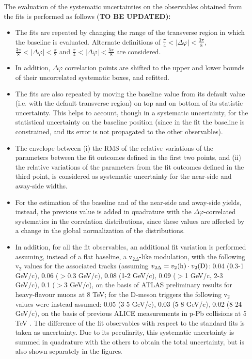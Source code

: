 The evaluation of the systematic uncertainties on the observables obtained from the fits is performed as follows (\bf{TO BE UPDATED}):

\begin{itemize}
\item The fits are repeated by changing the range of the transverse region in which the baseline is evaluated. Alternate definitions of $\frac{\pi}{4}<|\Delta\varphi|<\frac{3\pi}{8}$, $\frac{3\pi}{8}<|\Delta\varphi|<\frac{\pi}{2}$ and $\frac{\pi}{4}<|\Delta\varphi|<\frac{5\pi}{8}$ are considered.
\item In addition, $\Delta\varphi$ correlation points are shifted to the upper and lower bounds of their uncorrelated systematic boxes, and refitted.
\item The fits are also repeated by moving the baseline value from its default value (i.e. with the default transverse region) on top and on bottom of its statistic uncertainty. This helps to account, though in a systematic uncertainty, for the statistical uncertainty on the baseline position (since in the fit the baseline is constrained, and its error is not propagated to the other observables).
\item The envelope between (i) the RMS of the relative variations of the parameters between the fit outcomes defined in the first two points, and (ii) the relative variations of the parameters from the fit outcomes defined in the third point, is considered as systematic uncertainty for the near-side and away-side widths.
\item For the estimation of the baseline and of the near-side and away-side yields, instead, the previous value is added in quadrature with the $\Delta\varphi$-correlated systematics in the correlation distributions, since these values are affected by a change in the global normalization of the distributions.
\item In addition, for all the fit observables, an additional fit variation is performed assuming, instead of a flat baseline, a v$_{2\Delta}$-like modulation, with the following v$_2$ values for the associated tracks (assuming $v_{2\Delta} = v_2({\rm h}) \cdot v_2({\rm D})$: 0.04 (0.3-1 GeV/c), 0.06 ($>$0.3 GeV/c), 0.08 (1-2 GeV/c), 0.09 ($>$1 GeV/c, 2-3 GeV/c), 0.1 ($>$3 GeV/c), on the basis of ATLAS preliminary results for heavy-flavour muons at 8 TeV; for the D-meson triggers the following v$_2$ values were instead assumed: 0.05 (3-5 GeV/c), 0.03 (5-8 GeV/c), 0.02 (8-24 GeV/c), on the basis of previous ALICE measurements in p-Pb collisions at 5 TeV \cite{ALICEv2ppb}. The difference of the fit observables with respect to the standard fits is taken as uncertainty. Due to its peculiarity, this systematic uncertainty is summed in quadrature with the others to obtain the total uncertainty, but is also shown separately in the figures.
\end{itemize}

